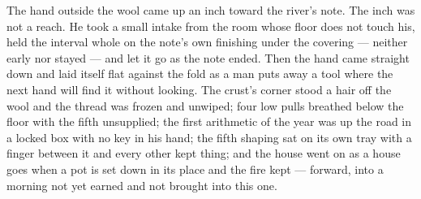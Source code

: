 The hand outside the wool came up an inch toward the river's note. The inch was not a reach. He took a small intake from the room whose floor does not touch his, held the interval whole on the note's own finishing under the covering --- neither early nor stayed --- and let it go as the note ended. Then the hand came straight down and laid itself flat against the fold as a man puts away a tool where the next hand will find it without looking. The crust's corner stood a hair off the wool and the thread was frozen and unwiped; four low pulls breathed below the floor with the fifth unsupplied; the first arithmetic of the year was up the road in a locked box with no key in his hand; the fifth shaping sat on its own tray with a finger between it and every other kept thing; and the house went on as a house goes when a pot is set down in its place and the fire kept --- forward, into a morning not yet earned and not brought into this one.
